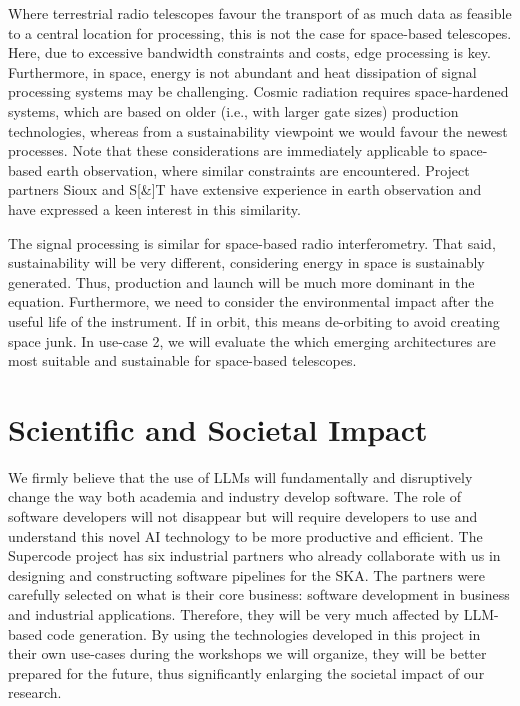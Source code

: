 \documentclass[a4wide,twocolumn]{article}
\begin{document}
Where terrestrial radio telescopes favour the transport of as much data as feasible to a central location for processing, this is not the case for space-based telescopes. Here, due to excessive bandwidth constraints and costs, edge processing is key. Furthermore, in space, energy is not abundant and heat dissipation of signal processing systems may be challenging. Cosmic radiation requires space-hardened systems, which are based on older (i.e., with larger gate sizes) production technologies, whereas from a sustainability viewpoint we would favour the newest processes. Note that these considerations are immediately applicable to space-based earth observation, where similar constraints are encountered. Project partners Sioux and S[\&]T have extensive experience in earth observation and have expressed a keen interest in this similarity.

The signal processing is similar for space-based radio interferometry. That said, sustainability will be very different, considering energy in space is sustainably generated. Thus, production and launch will be much more dominant in the equation. Furthermore, we need to consider the environmental impact after the useful life of the instrument. If in orbit, this means de-orbiting to avoid creating space junk. In use-case 2, we will evaluate the which emerging architectures are most suitable and sustainable for space-based telescopes.

\section{Scientific and Societal Impact}
We firmly believe that the use of LLMs will fundamentally and disruptively change the way both academia and industry develop software. The role of software developers will not disappear but will require developers to use and understand this novel AI technology to be more productive and efficient. The Supercode project has six industrial partners who  already collaborate with us in designing and constructing software pipelines for the SKA. The partners were carefully selected on what is their core business: software development in business and industrial applications. Therefore, they will be very much affected by LLM-based code generation. By using the technologies developed in this project in their own use-cases during the workshops we will organize, they will be better prepared for the future, thus significantly enlarging the societal impact of our research.
\end{document}
